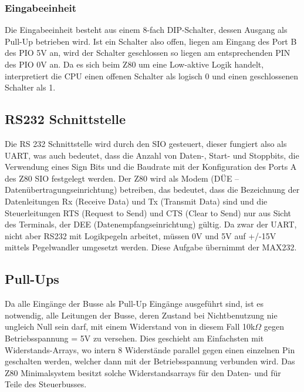 \subsubsection{Eingabeeinheit}
Die Eingabeeinheit besteht aus einem 8-fach DIP-Schalter, dessen Ausgang als Pull-Up betrieben wird. Ist ein Schalter also offen, liegen am Eingang des Port B des PIO 5V an, wird der Schalter geschlossen so liegen am entsprechenden PIN des PIO 0V an. Da es sich beim Z80 um eine Low-aktive Logik handelt, interpretiert die CPU einen offenen Schalter als logisch 0 und einen geschlossenen Schalter als 1.

\subsection{RS232 Schnittstelle}
Die RS 232 Schnittstelle wird durch den SIO gesteuert, dieser fungiert also als UART, was auch bedeutet, dass die Anzahl von Daten-, Start- und Stoppbits, die Verwendung eines Sign Bits und die Baudrate mit der Konfiguration des Ports A des Z80 SIO festgelegt werden. Der Z80 wird als Modem (DÜE – Datenübertragungseinrichtung) betreiben, das bedeutet, dass die Bezeichnung der Datenleitungen Rx (Receive Data) und Tx (Transmit Data) sind und die Steuerleitungen RTS (Request to Send) und CTS (Clear to Send) nur aus Sicht des Terminals, der DEE (Datenempfangseinrichtung) gültig. Da zwar der UART, nicht aber RS232 mit Logikpegeln arbeitet, müssen 0V und 5V auf +/-15V mittels Pegelwandler umgesetzt werden. Diese Aufgabe übernimmt der MAX232.

\subsection{Pull-Ups}
Da alle Eingänge der Busse als Pull-Up Eingänge ausgeführt sind, ist es notwendig, alle Leitungen der Busse, deren Zustand bei Nichtbenutzung nie ungleich Null sein darf, mit einem Widerstand von in diesem Fall 10k$\Omega$ gegen Betriebsspannung = 5V zu versehen. Dies geschieht am Einfachsten mit Widerstands-Arrays, wo intern 8 Widerstände parallel gegen einen einzelnen Pin geschalten werden, welcher dann mit der Betriebsspannung verbunden wird. Das Z80 Minimalsystem besitzt solche Widerstandsarrays für den Daten- und für Teile des Steuerbusses.

